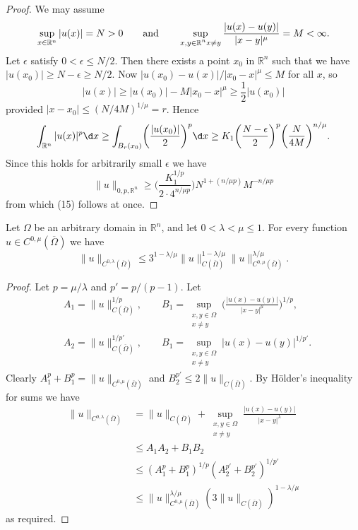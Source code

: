 \begin{proof}
  We may assume
  \[\sup_{x\in\mathbb{R}^n} |u(x)| = N > 0
    \qquad \text{and} \qquad
    \sup_{\substack{x,y\in\mathbb{R}^n}\\ x\neq y} \frac{|u(x)-u(y)|}{|x-y|^\mu} = M < \infty.\]
  Let $\epsilon$ satisfy $0<\epsilon\leq N/2$. Then there exists a point
  $x_0$ in $\mathbb{R}^n$ such that we have $|u(x_0)|\geq N-\epsilon\geq N/2$.
  Now $|u(x_0)-u(x)|/|x_0-x|^\mu \leq M$ for all $x$, so
  \[ |u(x)| \geq |u(x_0)| - M|x_0-x|^\mu \geq \frac12 |u(x_0)| \]
  provided $|x-x_0|\leq (N/4M)^{1/\mu} = r$. Hence
  \[ \int_{\mathbb{R}^n} |u(x)|^p \d x
    \geq \int_{B_r(x_0)} \biggl(\frac{|u(x_0)|}{2}\biggr)^p \d x
    \geq K_1 \biggl(\frac{N-\epsilon}{2}\biggr)^p \biggl(\frac{N}{4M}\biggr)^{n/\mu}. \]
  Since this holds for arbitrarily small $\epsilon$ we have
  \[ \|u\|_{0,p,\mathbb{R}^n} \geq \biggl(\frac{K_1^{1/p}}{2\cdot 4^{n/\mu p}}\biggr)
      N^{1+(n/\mu p)} M^{-n/\mu p} \]
  from which (15) follows at once.
\end{proof}


\begin{lemma}
  Let $\Omega$ be an arbitrary domain in $\mathbb{R}^n$, and let
  $0<\lambda<\mu\leq 1$. For every function $u\in C^{0,\mu}(\overline{\Omega})$
  we have
  \begin{equation}\label{eq:6.16}
    \|u\|_{C^{0,\lambda}(\overline{\Omega})} \leq 3^{1-\lambda/\mu}
    \|u\|_{C(\overline{\Omega})}^{1-\lambda/\mu} \|u\|_{C^{0,\mu}(\overline{\Omega})}^{\lambda/\mu}.
  \end{equation}
\end{lemma}


\begin{proof}
  Let $p = \mu/\lambda$ and $p'=p/(p-1)$. Let
  \begin{align*}
    & A_1 = \|u\|_{C(\overline{\Omega})}^{1/p}, \qquad
      B_1 = \sup_{\substack{x,y\in\Omega\\ x\neq y}} \biggl(\frac{|u(x)-u(y)|}{|x-y|^\mu}\biggr)^{1/p}, \\
    & A_2 = \|u\|_{C(\overline{\Omega})}^{1/p'}, \qquad
    B_1 = \sup_{\substack{x,y\in\Omega\\ x\neq y}} |u(x)-u(y)|^{1/p'}.
  \end{align*}
  Clearly $A_1^p + B_1^p = \|u\|_{C^{0,\mu}(\overline{\Omega})}$ and
  $B_2^{p'}\leq 2\|u\|_{C(\overline{\Omega})}$.
  By H\"older's inequality for sums we have
  \begin{align*}
    \|u\|_{C^{0,\lambda}(\overline{\Omega})}
    & = \|u\|_{C(\overline{\Omega})}
        + \sup_{\substack{x,y\in\Omega\\ x\neq y}} \frac{|u(x)-u(y)|}{|x-y|^\lambda} \\
    & \leq A_1A_2 + B_1B_2 \\
    & \leq (A_1^p+B_1^p)^{1/p} (A_2^{p'} + B_2^{p'})^{1/p'} \\
    & \leq \|u\|_{C^{0,\mu}(\overline{\Omega})}^{\lambda/\mu}
        (3\|u\|_{C(\overline{\Omega})})^{1-\lambda/\mu}
  \end{align*}
  as required.
\end{proof}


